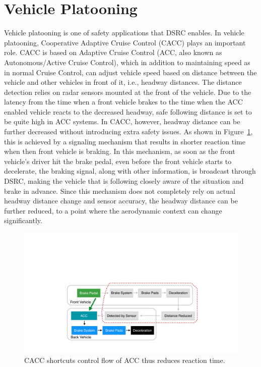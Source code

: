 \documentclass[12pt]{report}
\begin{document}
\section{Vehicle Platooning}
Vehicle platooning is one of safety applications that DSRC enables. In vehicle platooning, Cooperative Adaptive Cruise Control (CACC) plays an important role. CACC is based on Adaptive Cruise Control (ACC, also known as Autonomous/Active Cruise Control), which in addition to maintaining speed as in normal Cruise Control, can adjust vehicle speed based on distance between the vehicle and other vehicles in front of it, i.e., headway distances. The distance detection relies on radar sensors mounted at the front of the vehicle. Due to the latency from the time when a front vehicle brakes to the time when the ACC enabled vehicle reacts to the decreased headway, safe following distance is set to be quite high in ACC systems. In CACC, however, headway distance can be further decreased without introducing extra safety issues. As shown in Figure~\ref{fig:brake}, this is achieved by a signaling mechanism that results in shorter reaction time when then front vehicle is braking. In this mechanism, as soon as the front vehicle's driver hit the brake pedal, even before the front vehicle starts to decelerate, the braking signal, along with other information, is broadcast through DSRC, making the vehicle that is following closely aware of the situation and brake in advance. Since this mechanism does not completely rely on actual headway distance change and sensor accuracy, the headway distance can be further reduced, to a point where the aerodynamic context can change significantly.

\begin{figure}[htb]
  \begin{center}
    \includegraphics[width=.7\columnwidth]{figures/brake.pdf}
    \caption{\label{fig:brake}CACC shortcuts control flow of ACC thus reduces reaction time.}
  \end{center}
\end{figure}
\end{document}
